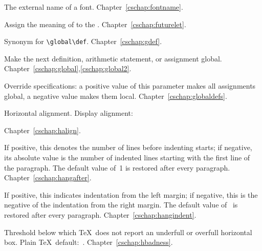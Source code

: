\begin{glossinventory}
\item [\cs{fontname\gr{font}}]
      The external name of a font.
Chapter~\ref{cschap:fontname}.

\item [\cs{futurelet\gr{control sequence}\gr{token$_1$}\gr{token$_2$}}]
      Assign the meaning of  to the
      .
Chapter~\ref{cschap:futurelet}.

\item [\cs{gdef}]
      Synonym for \verb-\global\def-.
Chapter~\ref{cschap:gdef}.

\item [\cs{global}]
      Make the next definition, arithmetic statement,
      or assignment global.
Chapter~\ref{cschap:global},\ref{cschap:global2}.

\item [\cs{globaldefs}]
      Override  specifications: a positive value of this
      parameter makes all assignments global, a negative value
      makes them local.
Chapter~\ref{cschap:globaldefs}.

\item [\cs{halign\gr{box specification}\lb\gr{alignment material}\rb{}}]
      Horizontal alignment.
      Display alignment:
      \begin{disp}\n{\$\$}\lb{}\rb
      \n{\$\$}\end{disp}
Chapter~\ref{cschap:halign}.

\item [\cs{hangafter}]
      If positive, this denotes the number of lines 
      before indenting starts; 
      if negative, its absolute value is the number 
      of indented lines starting with the first line of the paragraph. 
      The default value of~1 is restored after every paragraph.
Chapter~\ref{cschap:hangafter}.

\item [\cs{hangindent}]
      If positive, this indicates indentation from the left margin; 
      if negative, this is the negative of the indentation 
      from the right margin. 
      The default value of~\n{0pt} is restored after every paragraph.
Chapter~\ref{cschap:hangindent}.

\item [\cs{hbadness}]
      Threshold below which \TeX\ does not report an underfull 
      or overfull  horizontal box.
      Plain \TeX\ default:~.
Chapter~\ref{cschap:hbadness}.


\end{glossinventory}
